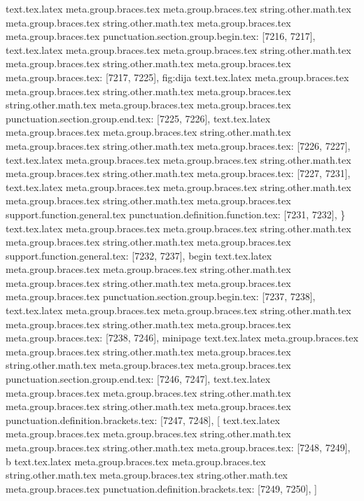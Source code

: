 {{{{{{{{{{{{{{{{{{{{{{{{{{{{{{{{{{{{{{{{{{{{{{{{{{{{{{{{{{{{{{{{{{{{{{{{{{{{{{{{{{{{{{{{{{{{{{{{{{{{{{{{{{{{{{{{{{{{{{{{{{{{{{{{{{{{{{{{{{{{{{{{{{{{{{{{{{{{{{{{{{{{{{{{{{{{{{{{{{{{{{{{{{{{{{{text.tex.latex meta.group.braces.tex meta.group.braces.tex string.other.math.tex meta.group.braces.tex string.other.math.tex meta.group.braces.tex meta.group.braces.tex punctuation.section.group.begin.tex: [7216, 7217], {{}
text.tex.latex meta.group.braces.tex meta.group.braces.tex string.other.math.tex meta.group.braces.tex string.other.math.tex meta.group.braces.tex meta.group.braces.tex: [7217, 7225], {fig:dija}
text.tex.latex meta.group.braces.tex meta.group.braces.tex string.other.math.tex meta.group.braces.tex string.other.math.tex meta.group.braces.tex meta.group.braces.tex punctuation.section.group.end.tex: [7225, 7226], {}}
text.tex.latex meta.group.braces.tex meta.group.braces.tex string.other.math.tex meta.group.braces.tex string.other.math.tex meta.group.braces.tex: [7226, 7227], {
}
text.tex.latex meta.group.braces.tex meta.group.braces.tex string.other.math.tex meta.group.braces.tex string.other.math.tex meta.group.braces.tex: [7227, 7231], {    }
text.tex.latex meta.group.braces.tex meta.group.braces.tex string.other.math.tex meta.group.braces.tex string.other.math.tex meta.group.braces.tex support.function.general.tex punctuation.definition.function.tex: [7231, 7232], {\}
text.tex.latex meta.group.braces.tex meta.group.braces.tex string.other.math.tex meta.group.braces.tex string.other.math.tex meta.group.braces.tex support.function.general.tex: [7232, 7237], {begin}
text.tex.latex meta.group.braces.tex meta.group.braces.tex string.other.math.tex meta.group.braces.tex string.other.math.tex meta.group.braces.tex meta.group.braces.tex punctuation.section.group.begin.tex: [7237, 7238], {{}
text.tex.latex meta.group.braces.tex meta.group.braces.tex string.other.math.tex meta.group.braces.tex string.other.math.tex meta.group.braces.tex meta.group.braces.tex: [7238, 7246], {minipage}
text.tex.latex meta.group.braces.tex meta.group.braces.tex string.other.math.tex meta.group.braces.tex string.other.math.tex meta.group.braces.tex meta.group.braces.tex punctuation.section.group.end.tex: [7246, 7247], {}}
text.tex.latex meta.group.braces.tex meta.group.braces.tex string.other.math.tex meta.group.braces.tex string.other.math.tex meta.group.braces.tex punctuation.definition.brackets.tex: [7247, 7248], {[}
text.tex.latex meta.group.braces.tex meta.group.braces.tex string.other.math.tex meta.group.braces.tex string.other.math.tex meta.group.braces.tex: [7248, 7249], {b}
text.tex.latex meta.group.braces.tex meta.group.braces.tex string.other.math.tex meta.group.braces.tex string.other.math.tex meta.group.braces.tex punctuation.definition.brackets.tex: [7249, 7250], {]}
}}}}}}}}}}}}}}}}}}}}}}}}}}}}}}}}}}}}}}}}}}}}}}}}}}}}}}}}}}}}}}}}}}}}}}}}}}}}}}}}}}}}}}}}}}}}}}}}}}}}}}}}}}}}}}}}}}}}}}}}}}}}}}}}}}}}}}}}}}}}}}}}}}}}}}}}}}}}}}}}}}}}}}}}}}}}}}}}}}}}}}}}}}}}}}}}

